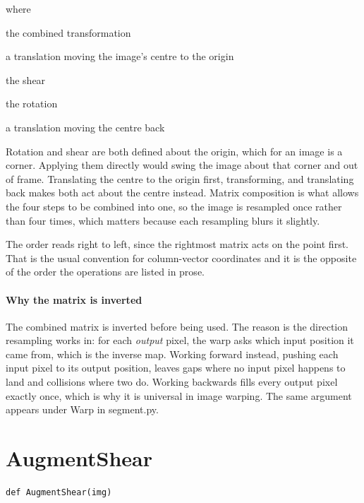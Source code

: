 \noindent where
\begin{description}[leftmargin=2.4em,style=nextline,font=\normalfont\ttfamily]\setlength\itemsep{1pt}
  \item[{$M$}] \normalfont the combined transformation
  \item[{$T_{-c}$}] \normalfont a translation moving the image's centre to the origin
  \item[{$S$}] \normalfont the shear
  \item[{$R$}] \normalfont the rotation
  \item[{$T_{+c}$}] \normalfont a translation moving the centre back
\end{description}
Rotation and shear are both defined about the origin, which for an image is a corner. Applying them directly would swing the image about that corner and out of frame. Translating the centre to the origin first, transforming, and translating back makes both act about the centre instead. Matrix composition is what allows the four steps to be combined into one, so the image is resampled once rather than four times, which matters because each resampling blurs it slightly.

The order reads right to left, since the rightmost matrix acts on the point first. That is the usual convention for column-vector coordinates and it is the opposite of the order the operations are listed in prose.


\paragraph{Why the matrix is inverted}
The combined matrix is inverted before being used. The reason is the direction resampling works in: for each \emph{output} pixel, the warp asks which input position it came from, which is the inverse map. Working forward instead, pushing each input pixel to its output position, leaves gaps where no input pixel happens to land and collisions where two do. Working backwards fills every output pixel exactly once, which is why it is universal in image warping. The same argument appears under Warp in segment.py.


\section{AugmentShear}
\begin{lstlisting}[style=sig]
def AugmentShear(img)
\end{lstlisting}

